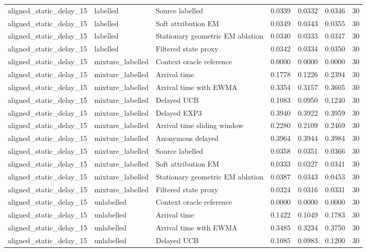 \begin{tabular}{llllllr}
aligned\_static\_delay\_15 & labelled & Source labelled & 0.0339 & 0.0332 & 0.0346 & 30 \\
aligned\_static\_delay\_15 & labelled & Soft attribution EM & 0.0349 & 0.0343 & 0.0355 & 30 \\
aligned\_static\_delay\_15 & labelled & Stationary geometric EM ablation & 0.0340 & 0.0333 & 0.0347 & 30 \\
aligned\_static\_delay\_15 & labelled & Filtered state proxy & 0.0342 & 0.0334 & 0.0350 & 30 \\
aligned\_static\_delay\_15 & mixture\_labelled & Context oracle reference & 0.0000 & 0.0000 & 0.0000 & 30 \\
aligned\_static\_delay\_15 & mixture\_labelled & Arrival time & 0.1778 & 0.1226 & 0.2394 & 30 \\
aligned\_static\_delay\_15 & mixture\_labelled & Arrival time with EWMA & 0.3354 & 0.3157 & 0.3605 & 30 \\
aligned\_static\_delay\_15 & mixture\_labelled & Delayed UCB & 0.1083 & 0.0950 & 0.1240 & 30 \\
aligned\_static\_delay\_15 & mixture\_labelled & Delayed EXP3 & 0.3940 & 0.3922 & 0.3959 & 30 \\
aligned\_static\_delay\_15 & mixture\_labelled & Arrival time sliding window & 0.2280 & 0.2109 & 0.2469 & 30 \\
aligned\_static\_delay\_15 & mixture\_labelled & Anonymous delayed & 0.3964 & 0.3944 & 0.3984 & 30 \\
aligned\_static\_delay\_15 & mixture\_labelled & Source labelled & 0.0358 & 0.0351 & 0.0366 & 30 \\
aligned\_static\_delay\_15 & mixture\_labelled & Soft attribution EM & 0.0333 & 0.0327 & 0.0341 & 30 \\
aligned\_static\_delay\_15 & mixture\_labelled & Stationary geometric EM ablation & 0.0387 & 0.0343 & 0.0453 & 30 \\
aligned\_static\_delay\_15 & mixture\_labelled & Filtered state proxy & 0.0324 & 0.0316 & 0.0331 & 30 \\
aligned\_static\_delay\_15 & unlabelled & Context oracle reference & 0.0000 & 0.0000 & 0.0000 & 30 \\
aligned\_static\_delay\_15 & unlabelled & Arrival time & 0.1422 & 0.1049 & 0.1783 & 30 \\
aligned\_static\_delay\_15 & unlabelled & Arrival time with EWMA & 0.3485 & 0.3234 & 0.3750 & 30 \\
aligned\_static\_delay\_15 & unlabelled & Delayed UCB & 0.1085 & 0.0983 & 0.1200 & 30 \\

\end{tabular}
